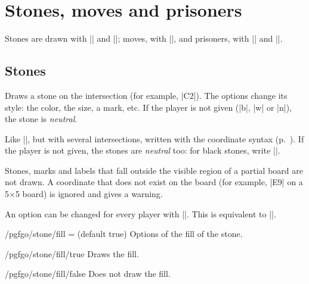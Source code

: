 \section{Stones, moves and prisoners}
\label{sec:piedras}

Stones are drawn with |\stone| and |\stones|; moves, with |\moves|, and prisoners, with |\prisoner| and |\prisoners|.

\subsection{Stones}

\begin{command}{\stone{}}
	Draws a stone on the intersection (for example, |C2|). The options change its style: the color, the size, a mark, etc. If the player is not given (|b|, |w| or |n|), the stone is \emph{neutral}.
\end{command}


\begin{command}{\stones{}}
	Like |\stone|, but with several intersections, written with the coordinate syntax (p.~\pageref{subsec:sintaxis-de-coordenadas}). If the player is not given, the stones are \emph{neutral} too: for black stones, write ||.
\end{command}

Stones, marks and labels that fall outside the visible region of a partial board are not drawn. A coordinate that does not exist on the board (for example, |E9| on a 5$\times$5 board) is ignored and gives a warning.

An option can be changed for every player with ||. This is equivalent to ||.


\begin{key}{/pgfgo/stone/fill =  (default true)}
	Options of the fill of the stone.
\end{key}

\begin{key}{/pgfgo/stone/fill/true}
	Draws the fill.
\end{key}

\begin{key}{/pgfgo/stone/fill/false}
	Does not draw the fill.

	\begin{codeexample}[]

		\begin{goban}
		\end{goban}

		\begin{goban}
			\stones[b]{C2,D3}
			\stone[w, fill = false]{B4}
		\end{goban}
	\end{codeexample}
\end{key}



